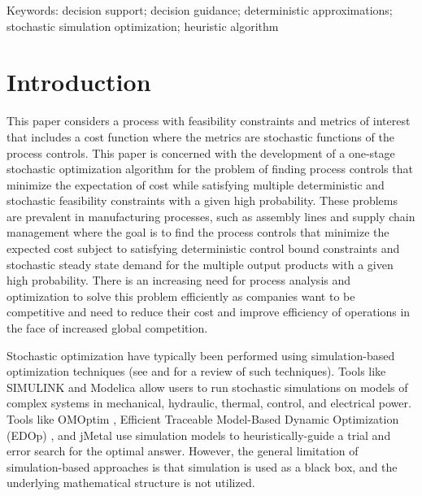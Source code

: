\documentclass[a4paper, 12pt]{article} %
\begin{document}
{\small  Keywords: decision support;
	decision guidance;
	deterministic approximations;
	stochastic simulation optimization;
	heuristic algorithm } %

\vspace{5pt} %

\section{Introduction}

This paper considers a process with feasibility constraints and metrics of interest that includes a cost function where the metrics are stochastic functions of the process controls.
This paper is concerned with the development of a one-stage stochastic optimization algorithm for the problem of finding process controls that minimize the expectation of cost while satisfying multiple deterministic and stochastic feasibility constraints with a given high probability.
These problems are prevalent in manufacturing processes, such as assembly lines and supply chain management where the goal is to find the process controls that minimize the expected cost subject to satisfying deterministic control bound constraints and stochastic steady state demand for the multiple output products with a given high probability. 
There is an increasing need for process analysis and optimization to solve this problem efficiently as companies want to be competitive and need to reduce their cost and improve efficiency of operations in the face of increased global competition. 


Stochastic optimization have typically been performed using simulation-based optimization techniques (see \cite{Amaran2016} and \cite{Nguyen2014} for a review of such techniques). 
Tools like SIMULINK \cite{Dabney:2001:MS:557989} and Modelica \cite{elmqvist1998modelica,Provan2012modelica} allow users to run stochastic simulations on models of complex systems in mechanical, hydraulic, thermal, control, and electrical power.
Tools like OMOptim \cite{OMOptim}, Efficient Traceable Model-Based Dynamic Optimization (EDOp) \cite{EDOp}, and jMetal \cite{jMetal} use simulation models to heuristically-guide a trial and error search for the optimal answer. 
However, the general limitation of simulation-based approaches is that simulation is used as a black box, and the underlying mathematical structure is not utilized. 
\end{document}
